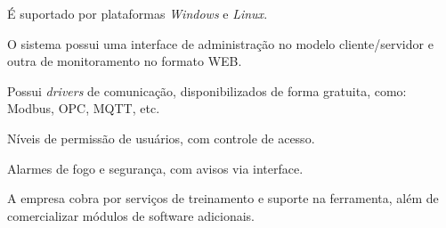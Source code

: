     \begin{alineascomponto}
        \item É suportado por plataformas \textit{Windows} e \textit{Linux}.
	    \item O sistema possui uma interface de administração no modelo cliente/servidor e outra de monitoramento no formato \gls{WEB}.
	    \item Possui \textit{drivers} de comunicação, disponibilizados de forma gratuita, como: Modbus, \gls{OPC}, \gls{MQTT}, etc.
	    \item Níveis de permissão de usuários, com controle de acesso.
	    \item Alarmes de fogo e segurança, com avisos via interface.
	    \item A empresa cobra por serviços de treinamento e suporte na ferramenta, além de comercializar módulos de software adicionais.
    \end{alineascomponto}